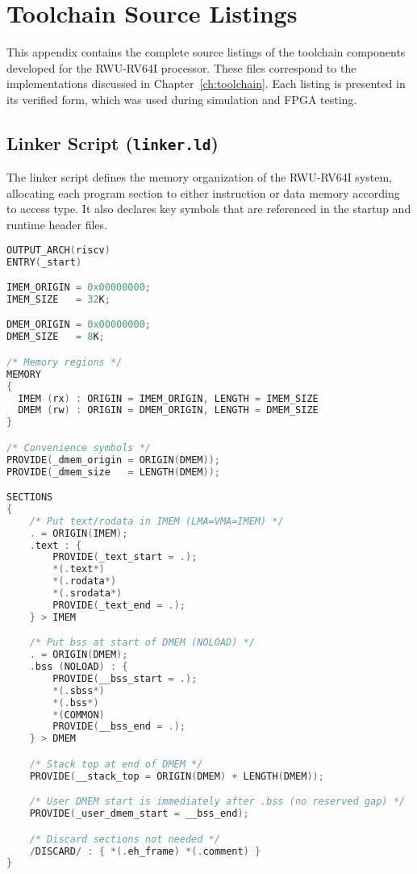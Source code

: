 \appendix
\chapter{Toolchain Source Listings}
\label{app:toolchain_appendix}

This appendix contains the complete source listings of the toolchain components developed for the RWU-RV64I processor.  
These files correspond to the implementations discussed in Chapter~\ref{ch:toolchain}.  
Each listing is presented in its verified form, which was used during simulation and FPGA testing.

\section{Linker Script (\texttt{linker.ld})}
\label{app:linker_script}

The linker script defines the memory organization of the RWU-RV64I system, allocating each program section to either instruction or data memory according to access type.  
It also declares key symbols that are referenced in the startup and runtime header files.

\begin{lstlisting}[language=C,caption={RWU-RV64I Linker Script},label={lst:linker_script}]
OUTPUT_ARCH(riscv)
ENTRY(_start)

IMEM_ORIGIN = 0x00000000;
IMEM_SIZE   = 32K;

DMEM_ORIGIN = 0x00000000;
DMEM_SIZE   = 8K;

/* Memory regions */
MEMORY
{
  IMEM (rx) : ORIGIN = IMEM_ORIGIN, LENGTH = IMEM_SIZE
  DMEM (rw) : ORIGIN = DMEM_ORIGIN, LENGTH = DMEM_SIZE
}

/* Convenience symbols */
PROVIDE(_dmem_origin = ORIGIN(DMEM));
PROVIDE(_dmem_size   = LENGTH(DMEM));

SECTIONS
{
    /* Put text/rodata in IMEM (LMA=VMA=IMEM) */
    . = ORIGIN(IMEM);
    .text : {
        PROVIDE(_text_start = .);
        *(.text*)
        *(.rodata*)
        *(.srodata*)
        PROVIDE(_text_end = .);
    } > IMEM

    /* Put bss at start of DMEM (NOLOAD) */
    . = ORIGIN(DMEM);
    .bss (NOLOAD) : {
        PROVIDE(__bss_start = .);
        *(.sbss*)
        *(.bss*)
        *(COMMON)
        PROVIDE(__bss_end = .);
    } > DMEM

    /* Stack top at end of DMEM */
    PROVIDE(__stack_top = ORIGIN(DMEM) + LENGTH(DMEM));

    /* User DMEM start is immediately after .bss (no reserved gap) */
    PROVIDE(_user_dmem_start = __bss_end);

    /* Discard sections not needed */
    /DISCARD/ : { *(.eh_frame) *(.comment) }
}
\end{lstlisting}

